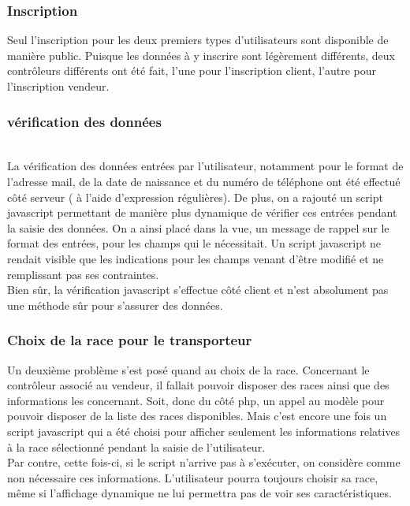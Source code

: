 \documentclass{article}
\begin{document}
\subsubsection{Inscription}
Seul l'inscription pour les deux premiers types d'utilisateurs sont disponible de manière public. Puisque les données à y inscrire sont légèrement différents, deux contrôleurs différents ont été fait, l'une pour l'inscription client, l'autre pour l'inscription vendeur. 
\subsubsection{vérification des données}
\\
La vérification des données entrées par l'utilisateur, notamment pour le format de l'adresse mail, de la date de naissance et du numéro de téléphone ont été effectué côté serveur ( à l'aide d'expression régulières).  
De plus, on a rajouté un script javascript permettant de manière plus dynamique de vérifier ces entrées pendant la saisie des données. On a ainsi placé dans la vue, un message de rappel sur le format des entrées, pour les champs qui le nécessitait. Un script javascript ne rendait visible que les indications pour les champs venant d'être modifié et ne remplissant pas ses contraintes. 
\\
Bien sûr, la vérification javascript s'effectue côté client et n'est absolument pas une méthode sûr pour s'assurer des données. 
\subsubsection{Choix de la race pour le transporteur} 
Un deuxième problème s'est posé quand au choix de la race. Concernant le contrôleur associé au vendeur, il fallait pouvoir disposer des races ainsi que des informations les concernant. Soit, donc du côté php, un appel au modèle pour pouvoir disposer de la liste des races disponibles.
Mais c'est encore une fois un script javascript qui a été choisi pour afficher seulement les informations relatives à la race sélectionné pendant la saisie de l'utilisateur. 
\\
Par contre, cette fois-ci, si le script n'arrive pas à s'exécuter, on considère comme non nécessaire ces informations. L'utilisateur pourra toujours choisir sa race, même si l'affichage dynamique ne lui permettra pas de voir ses caractéristiques. 
\end{document}

